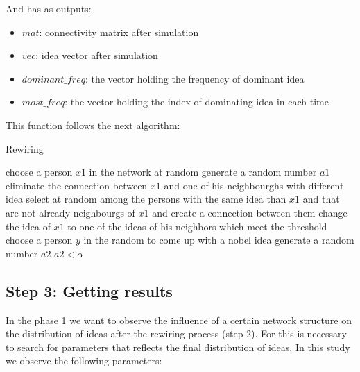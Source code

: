  And has as outputs:
 \begin{itemize}
 \item $mat$: connectivity matrix after simulation
\item $vec$: idea vector after simulation
\item $dominant\_freq$: the vector holding the frequency of dominant idea
 \item $most\_freq$: the vector holding the index of dominating idea in each time
\end{itemize}

This function follows the next algorithm:

\begin{algorithm}                      %
\caption{Rewiring}          %
\label{alg1}                           %
\begin{algorithmic}                    %
    	\State choose a person $x1$ in the network at random
	\State generate a random number $a1$
     
        \State eliminate the connection between $x1$ and one of his neighbourghs with different idea
        \State select at random among the persons with the same idea than $x1$ and that are not already neighbourgs of $x1$ and create a connection between them
    \Else change the idea of $x1$ to one of the ideas of his neighbors which meet the threshold 
            \EndIf
    \State choose a person $y$ in the random to come up with a nobel idea
    \State generate a random number $a2$
    \If $a2<\alpha$ 
     \EndIf
   \EndFor
\end{algorithmic}
\end{algorithm}

\subsection{Step 3: Getting results}

In the phase 1 we want to observe the influence of a certain network structure  on the distribution of ideas after the rewiring process (step 2). For this is necessary to search for parameters that reflects the final distribution of ideas. In this study we observe the following parameters:

